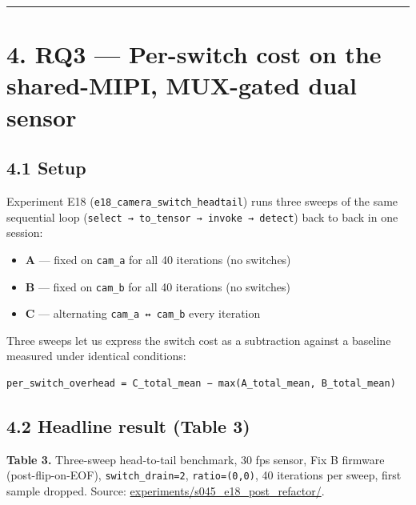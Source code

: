 \begin{center}\rule{0.5\linewidth}{0.5pt}\end{center}

\section{4. RQ3 --- Per-switch cost on the shared-MIPI, MUX-gated dual
sensor}\label{rq3-per-switch-cost-on-the-shared-mipi-mux-gated-dual-sensor}

\subsection{4.1 Setup}\label{setup-2}

Experiment E18 (\texttt{e18\_camera\_switch\_headtail}) runs three
sweeps of the same sequential loop
(\texttt{select\ →\ to\_tensor\ →\ invoke\ →\ detect}) back to back in
one session:

\begin{itemize}
\tightlist
\item
  \textbf{A} --- fixed on \texttt{cam\_a} for all 40 iterations (no
  switches)
\item
  \textbf{B} --- fixed on \texttt{cam\_b} for all 40 iterations (no
  switches)
\item
  \textbf{C} --- alternating \texttt{cam\_a\ ↔\ cam\_b} every iteration
\end{itemize}

Three sweeps let us express the switch cost as a subtraction against a
baseline measured under identical conditions:

\begin{verbatim}
per_switch_overhead = C_total_mean − max(A_total_mean, B_total_mean)
\end{verbatim}

\subsection{4.2 Headline result (Table
3)}\label{headline-result-table-3}

\textbf{Table 3.} Three-sweep head-to-tail benchmark, 30 fps sensor, Fix
B firmware (post-flip-on-EOF), \texttt{switch\_drain=2},
\texttt{ratio=(0,0)}, 40 iterations per sweep, first sample dropped.
Source:
\href{../experiments/s045_e18_post_refactor/}{experiments/s045\_e18\_post\_refactor/}.

